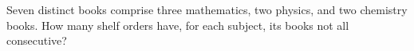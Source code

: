 Seven distinct books comprise three mathematics, two physics, and two chemistry books. How many shelf orders have, for each subject, its books not all consecutive?
